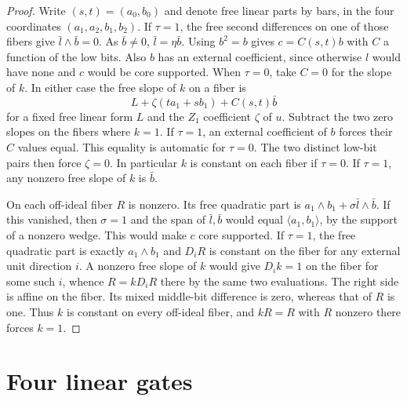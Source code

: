 \documentclass[11pt,a4paper]{article}
\theoremstyle{plain}
\theoremstyle{remark}
\theoremstyle{plain}
\begin{document}
\begin{proof}
Write $(s,t)=(a_0,b_0)$ and denote free linear parts by bars, in the four coordinates $(a_1,a_2,b_1,b_2)$. If $\tau=1$, the free second differences on one of those fibers give $\bar l\wedge\bar b=0$. As $\bar b\ne0$, $\bar l=\eta\bar b$. Using $b^2=b$ gives $c=C(s,t)b$ with $C$ a function of the low bits. Also $b$ has an external coefficient, since otherwise $l$ would have none and $c$ would be core supported. When $\tau=0$, take $C=0$ for the slope of $k$. In either case the free slope of $k$ on a fiber is
\[
L+\zeta(t a_1+s b_1)+C(s,t)\bar b
\]
for a fixed free linear form $L$ and the $Z_1$ coefficient $\zeta$ of $u$. Subtract the two zero slopes on the fibers where $k=1$. If $\tau=1$, an external coefficient of $b$ forces their $C$ values equal. This equality is automatic for $\tau=0$. The two distinct low-bit pairs then force $\zeta=0$. In particular $k$ is constant on each fiber if $\tau=0$. If $\tau=1$, any nonzero free slope of $k$ is $\bar b$.

On each off-ideal fiber $R$ is nonzero. Its free quadratic part is $a_1\wedge b_1+\sigma\bar l\wedge\bar b$. If this vanished, then $\sigma=1$ and the span of $\bar l,\bar b$ would equal $\langle a_1,b_1\rangle$, by the support of a nonzero wedge. This would make $c$ core supported. If $\tau=1$, the free quadratic part is exactly $a_1\wedge b_1$ and $D_iR$ is constant on the fiber for any external unit direction $i$. A nonzero free slope of $k$ would give $D_i k=1$ on the fiber for some such $i$, whence $R=kD_iR$ there by the same two evaluations. The right side is affine on the fiber. Its mixed middle-bit difference is zero, whereas that of $R$ is one. Thus $k$ is constant on every off-ideal fiber, and $kR=R$ with $R$ nonzero there forces $k=1$.
\end{proof}


\section{Four linear gates}\label{sec:lambda4}
\end{document}
